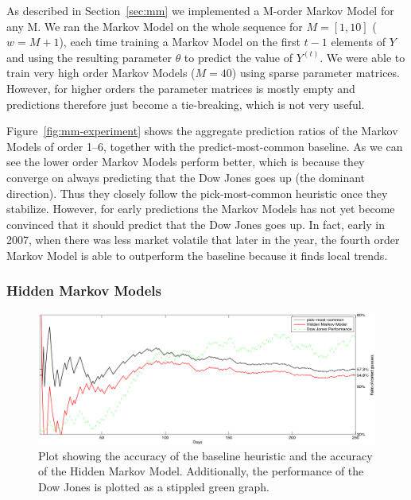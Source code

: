 \documentclass[10pt, twocolumn]{article}
\begin{document}
As described in Section~\ref{sec:mm} we implemented a M-order Markov Model for any M.
We ran the Markov Model on the whole sequence for $M=[1,10]$ ($w=M+1$), each time training a Markov Model on the first $t-1$ elements of $Y$ and using the resulting parameter $\theta$ to predict the value of $Y^{(t)}$.
We were able to train very high order Markov Models ($M=40$) using sparse parameter matrices.
However, for higher orders the parameter matrices is mostly empty and predictions therefore just become a tie-breaking, which is not very useful.

Figure~\ref{fig:mm-experiment} shows the aggregate prediction ratios of the Markov Models of order 1--6, together with the predict-most-common baseline.
As we can see the lower order Markov Models perform better, which is because they converge on always predicting that the Dow Jones goes up (the dominant direction). Thus they closely follow the pick-most-common heuristic once they stabilize.
However, for early predictions the Markov Models has not yet become convinced that it should predict that the Dow Jones goes up. In fact, early in 2007, when there was less market volatile that later in the year, the fourth order Markov Model is able to outperform the baseline because it finds local trends.

\subsubsection{Hidden Markov Models}
\label{hmm-eval}

\begin{figure}
\center
\hspace{0.5cm}
\includegraphics[width=16cm]{experiments/hmm_experiment.pdf}
\caption{Plot showing the accuracy of the baseline heuristic and the accuracy of the Hidden Markov Model. Additionally, the performance of the Dow Jones is plotted as a stippled green graph.}
\label{fig:hmm-experiment}
\end{figure}
\end{document}
